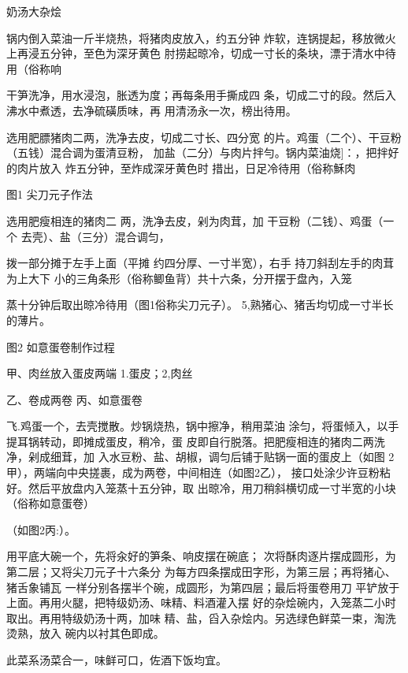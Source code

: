 \begin{recipe}{奶汤大杂烩}

\ingredients



\cooking

\step 锅内倒入菜油一斤半烧热，将猪肉皮放入，约五分钟 炸软，连锅提起，移放微火上再浸五分钟，至色为深牙黄色 肘捞起晾冷，切成一寸长的条块，漂于清水中待用（俗称响

\step 

\step 干笋洗净，用水浸泡，胀透为度；再每条用手撕成四 条，切成二寸的段。然后入沸水中煮透，去净硫磺质味，再 用清汤永一次，榜出待用。

\step 选用肥膘猪肉二两，洗净去皮，切成二寸长、四分宽 的片。鸡蛋（二个）、干豆粉（五钱）混合调为蛋清豆粉， 加盐（二分）与肉片拌勻。锅内菜油烧]：，把拌好的肉片放入 炸五分钟，至炸成深牙黄色时 措出，日足冷待用（俗称穌肉

图1 尖刀元子作法

选用肥瘦相连的猪肉二 两，洗净去皮，剁为肉茸，加 干豆粉（二钱）、鸡蛋（一个 去壳）、盐（三分）混合调匀，

拨一部分摊于左手上面（平摊 约四分厚、一寸半宽），右手 持刀斜刮左手的肉茸为上大下 小的三角条形（俗称鲫鱼背）共十六条，分开摆于盘內，入笼

蒸十分钟后取出晾冷待用（图1俗称尖刀元子）。 5,熟猪心、猪舌均切成一寸半长的薄片。

图2 如意蛋卷制作过程

甲、肉丝放入蛋皮两端 1.蛋皮；2,肉丝

乙、卷成两卷 丙、如意蛋卷

飞.鸡蛋一个，去壳搅散。炒锅烧热，锅中擦净，稍用菜油 涂匀，将蛋倾入，以手提耳锅转动，即摊成蛋皮，稍冷，蛋 皮即自行脱落。把肥瘦相连的猪肉二两洗净，剁成细茸，加 入水豆粉、盐、胡椒，调匀后铺于贴锅一面的蛋皮上（如图 2甲），两端向中央搓裹，成为两卷，中间相连（如图2乙）， 接口处涂少许豆粉粘好。然后平放盘内入笼蒸十五分钟，取 出晾冷，用刀稍斜横切成一寸半宽的小块（俗称如意蛋卷）

（如图2丙:）。

\step 用平底大碗一个，先将汆好的笋条、响皮摆在碗底； 次将酥肉逐片摆成圆形，为第二层；又将尖刀元子十六条分 为每方四条摆成田字形，为第三层；再将猪心、猪舌象铺瓦 一样分别各摆半个碗，成圆形，为第四层；最后将蛋卷用刀 平铲放于上面。再用火腿，把特级奶汤、味精、料酒灌入摆 好的杂烩碗内，入笼蒸二小时取出。再用特级奶汤十两，加味 精、盐，舀入杂烩内。另选绿色鲜菜一束，淘洗烫熟，放入 碗内以衬其色即成。

\notes

此菜系汤菜合一，味鲜可口，佐酒下饭均宜。

\end{recipe}

